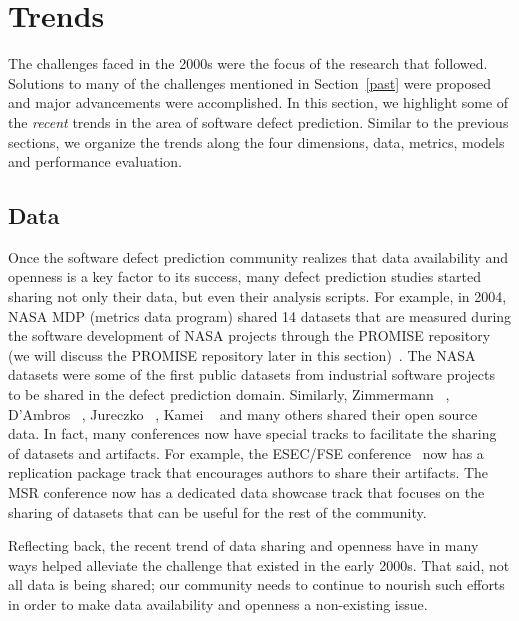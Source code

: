 \section{Trends} \label{trends}

The challenges faced in the 2000s were the focus of the research that followed. Solutions to many of the challenges mentioned in Section~\ref{past} were proposed and major advancements were accomplished. In this section, we highlight some of the \emph{recent} trends in the area of software defect prediction. 
Similar to the previous sections, we organize the trends along the four dimensions, data, metrics, models and performance evaluation.

\subsection{Data}

Once the software defect prediction community realizes that data availability and openness is a key factor to its success, many defect prediction studies started sharing not only their data, but even their analysis scripts. For example, in 2004, NASA MDP (metrics data program) shared 14 datasets that are measured during the software development of NASA projects through the PROMISE repository (we will discuss the PROMISE repository later in this section)~\cite{promiserepo}. The NASA datasets were some of the first public datasets from industrial software projects to be shared in the defect prediction domain. Similarly, Zimmermann \ea ~\cite{Zimmermann2007}, D'Ambros \ea ~\cite{Dambros10MSR}, Jureczko \ea ~\cite{Jureczko2010PROMISE}, Kamei \ea ~\cite{kamei2013tse} and many others shared their open source data. In fact, many conferences now have special tracks to facilitate the sharing of datasets and artifacts. For example, the ESEC/FSE conference~\cite{FSE2015} now has a replication package track that encourages authors to share their artifacts. The MSR conference now has a dedicated data showcase track that focuses on the sharing of datasets that can be useful for the rest of the community.

Reflecting back, the recent trend of data sharing and openness have in many ways helped alleviate the challenge that existed in the early 2000s. That said, not all data is being shared; our community needs to continue to nourish such efforts in order to make data availability and openness a non-existing issue. 


